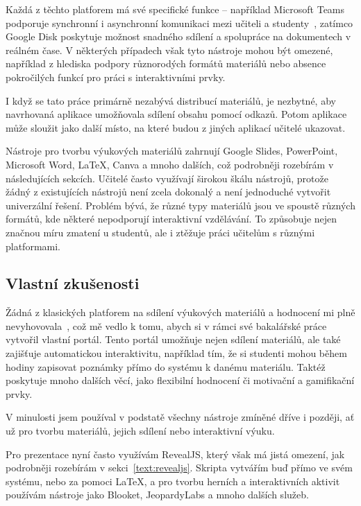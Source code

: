 Každá z těchto platforem má své specifické funkce -- například Microsoft Teams podporuje synchronní i asynchronní komunikaci mezi učiteli a studenty~\cite{teams}, zatímco Google Disk poskytuje možnost snadného sdílení a spolupráce na dokumentech v reálném čase.
V některých případech však tyto nástroje mohou být omezené, například z hlediska podpory různorodých formátů materiálů nebo absence pokročilých funkcí pro práci s interaktivními prvky.

I když se tato práce primárně nezabývá distribucí materiálů, je nezbytné, aby navrhovaná aplikace umožňovala sdílení obsahu pomocí odkazů.
Potom aplikace může sloužit jako další místo, na které budou z jiných aplikací učitelé ukazovat.

Nástroje pro tvorbu výukových materiálů zahrnují Google Slides, PowerPoint, Microsoft Word, \LaTeX, Canva a mnoho dalších, což podrobněji rozebírám v následujících sekcích.
Učitelé často využívají širokou škálu nástrojů, protože žádný z existujících nástrojů není zcela dokonalý a není jednoduché vytvořit univerzální řešení.
Problém bývá, že různé typy materiálů jsou ve spoustě různých formátů, kde některé nepodporují interaktivní vzdělávání.
To způsobuje nejen značnou míru zmatení u studentů, ale i ztěžuje práci učitelům s různými platformami.

\subsection{Vlastní zkušenosti}

Žádná z klasických platforem na sdílení výukových materiálů a hodnocení mi plně nevyhovovala~\cite{cajthaml_bp}, což mě vedlo k tomu, abych si v rámci své bakalářské práce vytvořil vlastní portál.
Tento portál umožňuje nejen sdílení materiálů, ale také zajišťuje automatickou interaktivitu, například tím, že si studenti mohou během hodiny zapisovat poznámky přímo do systému k danému materiálu.
Taktéž poskytuje mnoho dalších věcí, jako flexibilní hodnocení či motivační a gamifikační prvky.

V minulosti jsem používal v podstatě všechny nástroje zmíněné dříve i později, ať už pro tvorbu materiálů, jejich sdílení nebo interaktivní výuku.

Pro prezentace nyní často využívám RevealJS, který však má jistá omezení, jak podrobněji rozebírám v sekci~\ref{text:revealjs}.
Skripta vytvářím buď přímo ve svém systému, nebo za pomoci \LaTeX, a pro tvorbu herních a interaktivních aktivit používám nástroje jako Blooket, JeopardyLabs a mnoho dalších služeb.

